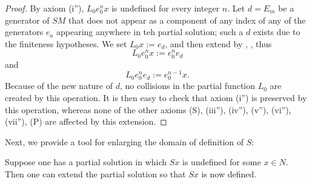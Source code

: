 \begin{proof}  By axiom (i''), $L_0 e_0^n x$ is undefined for every integer $n$.  Let $d = E_m$ be a generator of $SM$ that does not appear as a component of any index of any of the generators $e_a$ appearing anywhere in teh partial solution; such a $d$ exists due to the finiteness hypotheses.  We set $L_0 x := e_d$, and then extend by , , thus
$$L_0 e_0^n x := e_0^n e_d$$
and
$$L_0 e_0^n e_d := e_0^{n-1} x.$$
Because of the new nature of $d$, no collisions in the partial function $L_0$ are created by this operation.  It is then easy to check that axiom (i'') is preserved by this operation, whereas none of the other axioms (S), (iii''), (iv''), (v''), (vi''), (vii''), (P) are affected by this extension.
\end{proof}

Next, we provide a tool for enlarging the domain of definition of $S$:

\begin{proposition}[Enlarging $S$]\label{enlarge-S}  Suppose one has a partial solution in which $Sx$ is undefined for some $x \in N$.  Then one can extend the partial solution so that $Sx$ is now defined.
\end{proposition}

